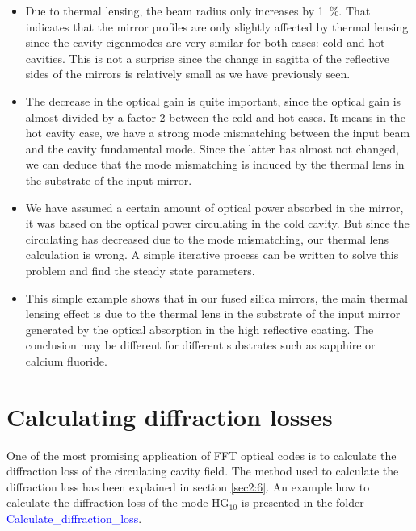 \begin{itemize}
  \item Due to thermal lensing, the beam radius only increases by 1~\%. That indicates that the mirror profiles are only slightly affected by thermal lensing since the cavity eigenmodes are very similar for both cases: cold and hot cavities. This is not a surprise since the change in sagitta of the reflective sides of the mirrors is relatively small as we have previously seen.
  \item The decrease in the optical gain is quite important, since the optical gain is almost divided by a factor 2 between the cold and hot cases. It means in the hot cavity case, we have a strong mode mismatching between the input beam and the cavity fundamental mode. Since the latter has almost not changed, we can deduce that the mode mismatching is induced by the thermal lens in the substrate of the input mirror.
  \item We have assumed a certain amount of optical power absorbed in the mirror, it was based on the optical power circulating in the cold cavity. But since the circulating has decreased due to the mode mismatching, our thermal lens calculation is wrong. A simple iterative process can be written to solve this problem and find the steady state parameters.
  \item This simple example shows that in our fused silica mirrors, the main thermal lensing effect is due to the thermal lens in the substrate of the input mirror generated by the optical absorption in the high reflective coating. The conclusion may be different for different substrates such as sapphire or calcium fluoride.
\end{itemize}

\section{Calculating diffraction losses}
\label{cha3.2}

One of the most promising application of FFT optical codes is to calculate the diffraction loss of the circulating cavity field. The method used to calculate the diffraction loss has been explained in section \ref{sec2:6}. An example how to calculate the diffraction loss of the mode HG$_{10}$ is presented in the folder \textcolor{blue}{Calculate\_diffraction\_loss}.

